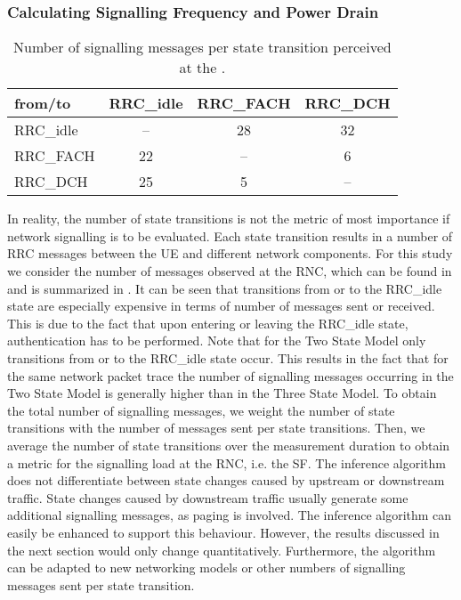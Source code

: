 \subsubsection*{Calculating Signalling Frequency and Power Drain}\label{sec:network:network_traces:calculating_metrics}

\begin{table}
\centering
  \caption{Number of signalling messages per  state transition perceived at the  \cite{3GPP_RRC_Spec}.}
  \label{tab:network:network_traces:calculating_metrics:signalling_messages}
\begin{tabular}{lccc}
	\toprule
    from/to & \gls{RRC_idle} & \gls{RRC_FACH} & \gls{RRC_DCH}\\
    \midrule
    \gls{RRC_idle} & -- & 28 & 32\\
    \gls{RRC_FACH} & 22 & -- & 6\\
    \gls{RRC_DCH} & 25 & 5 & --\\
    \bottomrule    
	\end{tabular}
\end{table}

In reality, the number of state transitions is not the metric of most importance if network signalling is to be evaluated.
Each state transition results in a number of \gls{RRC} messages between the \gls{UE} and different network components.
For this study we consider the number of messages observed at the \gls{RNC}, which can be found in \cite{3GPP_RRC_Spec} and is summarized in .
It can be seen that transitions from or to the \gls{RRC_idle} state are especially expensive in terms of number of messages sent or received.
This is due to the fact that upon entering or leaving the \gls{RRC_idle} state, authentication has to be performed. 
Note that for the Two State Model only transitions from or to the \gls{RRC_idle} state occur.
This results in the fact that for the same network packet trace the number of signalling messages occurring in the Two State Model is generally higher than in the Three State Model.
To obtain the total number of signalling messages, we weight the number of state transitions with the number of messages sent per state transitions.
Then, we average the number of state transitions over the measurement duration to obtain a metric for the signalling load at the \gls{RNC}, i.e. the \gls{SF}.
The inference algorithm does not differentiate between state changes caused by upstream or downstream traffic.
State changes caused by downstream traffic usually generate some additional signalling messages, as paging is involved.
The inference algorithm can easily be enhanced to support this behaviour.
However, the results discussed in the next section would only change quantitatively.
Furthermore, the algorithm can be adapted to new networking models or other numbers of signalling messages sent per state transition.

